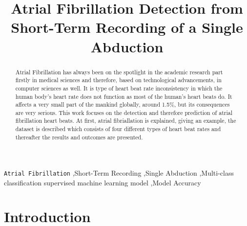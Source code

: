 \documentclass[review]{elsarticle}
\begin{document}
\begin{frontmatter}

\title{Atrial Fibrillation Detection from Short-Term Recording of a Single Abduction}



%

\begin{abstract}
Atrial Fibrillation has always been on the spotlight in the academic research part firstly in medical sciences and therefore, based on technological advancements, in computer sciences as well. It is type of heart beat rate inconsistency in which the human body's heart rate does not function as most of the human's heart beats do. It affects a very small part of the mankind globally, around 1.5\%, but its consequences are very serious. This work focuses on the detection and therefore prediction of atrial fibrillation heart beats. At first, atrial fibriallation is explained, giving an example, the dataset is described which consists of four different types of heart beat rates and thereafter the results and outcomes are presented.
\end{abstract}

\begin{keyword}
\texttt{Atrial Fibrillation} \sep Short-Term Recording
\sep Single Abduction
\sep Multi-class classification supervised machine learning model 
\sep Model Accuracy
\end{keyword}

\end{frontmatter}

\linenumbers

\section{Introduction}
\end{document}
